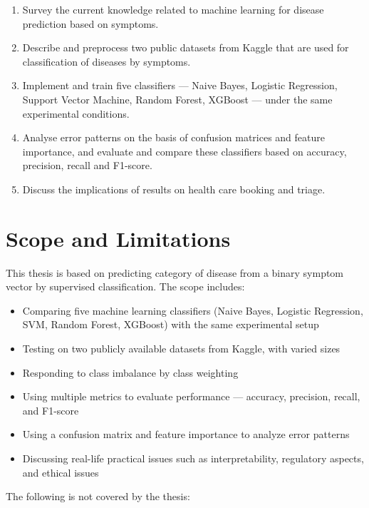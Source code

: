 \begin{enumerate}
    \item Survey the current knowledge related to machine learning for disease prediction based on symptoms.
    \item Describe and preprocess two public datasets from Kaggle that are used for classification of diseases by symptoms.
    \item Implement and train five classifiers --- Naive Bayes, Logistic Regression, Support Vector Machine, Random Forest, XGBoost --- under the same experimental conditions.
    \item Analyse error patterns on the basis of confusion matrices and feature importance, and evaluate and compare these classifiers based on accuracy, precision, recall and F1-score.
    \item Discuss the implications of results on health care booking and triage.
\end{enumerate}

\section{Scope and Limitations}
\label{sec:scope}

This thesis is based on predicting category of disease from a binary symptom vector by supervised classification. The scope includes:

\begin{itemize}
    \item Comparing five machine learning classifiers (Naive Bayes, Logistic Regression, SVM, Random Forest, XGBoost) with the same experimental setup
    \item Testing on two publicly available datasets from Kaggle, with varied sizes
    \item Responding to class imbalance by class weighting
    \item Using multiple metrics to evaluate performance --- accuracy, precision, recall, and F1-score
    \item Using a confusion matrix and feature importance to analyze error patterns
    \item Discussing real-life practical issues such as interpretability, regulatory aspects, and ethical issues
\end{itemize}

The following is not covered by the thesis:

